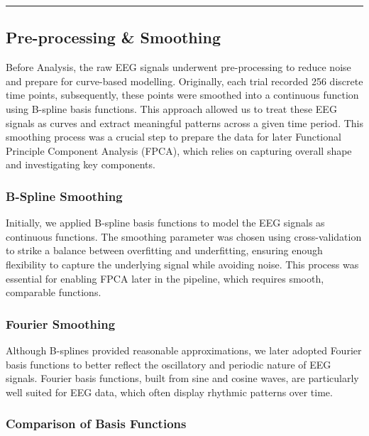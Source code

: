 \documentclass{article}
\begin{document}
\begin{center}\rule{0.5\linewidth}{0.5pt}\end{center}

\subsection{Pre-processing \& Smoothing}\label{pre-processing-smoothing}

Before Analysis, the raw EEG signals underwent pre-processing to reduce
noise and prepare for curve-based modelling. Originally, each trial
recorded 256 discrete time points, subsequently, these points were
smoothed into a continuous function using B-spline basis functions. This
approach allowed us to treat these EEG signals as curves and extract
meaningful patterns across a given time period. This smoothing process
was a crucial step to prepare the data for later Functional Principle
Component Analysis (FPCA), which relies on capturing overall shape and
investigating key components.

\subsubsection{B-Spline Smoothing}\label{b-spline-smoothing}

Initially, we applied B-spline basis functions to model the EEG signals
as continuous functions. The smoothing parameter was chosen using
cross-validation to strike a balance between overfitting and
underfitting, ensuring enough flexibility to capture the underlying
signal while avoiding noise. This process was essential for enabling
FPCA later in the pipeline, which requires smooth, comparable functions.

\subsubsection{Fourier Smoothing}\label{fourier-smoothing}

Although B-splines provided reasonable approximations, we later adopted
Fourier basis functions to better reflect the oscillatory and periodic
nature of EEG signals. Fourier basis functions, built from sine and
cosine waves, are particularly well suited for EEG data, which often
display rhythmic patterns over time.

\subsubsection{Comparison of Basis
Functions}\label{comparison-of-basis-functions}
\end{document}
